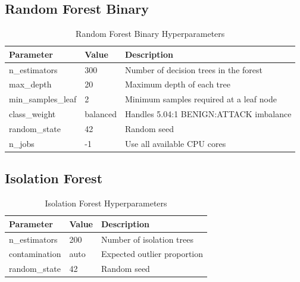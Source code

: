 \documentclass[12pt,a4paper]{article}
\begin{document}
\subsection{Random Forest Binary}
\begin{table}[H]
\centering
\caption{Random Forest Binary Hyperparameters}
\begin{tabular}{|l|l|p{5cm}|}
\hline
\textbf{Parameter} & \textbf{Value} & \textbf{Description} \\
\hline
n\_estimators & 300 & Number of decision trees in the forest \\
max\_depth & 20 & Maximum depth of each tree \\
min\_samples\_leaf & 2 & Minimum samples required at a leaf node \\
class\_weight & balanced & Handles 5.04:1 BENIGN:ATTACK imbalance \\
random\_state & 42 & Random seed \\
n\_jobs & -1 & Use all available CPU cores \\
\hline
\end{tabular}
\end{table}

\subsection{Isolation Forest}
\begin{table}[H]
\centering
\caption{Isolation Forest Hyperparameters}
\begin{tabular}{|l|l|p{5cm}|}
\hline
\textbf{Parameter} & \textbf{Value} & \textbf{Description} \\
\hline
n\_estimators & 200 & Number of isolation trees \\
contamination & auto & Expected outlier proportion \\
random\_state & 42 & Random seed \\
\hline
\end{tabular}
\end{table}
\end{document}
